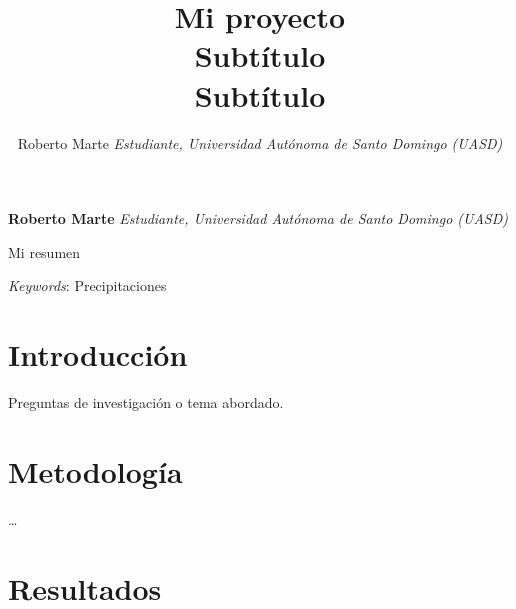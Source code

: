 \documentclass[11pt,]{article}
\title{Mi proyecto\\
Subtítulo\\
Subtítulo  }
\author{\Large Roberto Marte\vspace{0.05in} \newline\normalsize\emph{Estudiante, Universidad Autónoma de Santo Domingo (UASD)}  }
\date{}
\newcommand*{\authorfont}{\fontfamily{phv}\selectfont}
\renewenvironment{abstract}
 {{%
    \setlength{\leftmargin}{0mm}
    \setlength{\rightmargin}{\leftmargin}%
  }%
  \relax}
 {\endlist}
\begin{document}
	
%

{%
\setlength{\parindent}{0pt}
\thispagestyle{plain}
{\fontsize{18}{20}\selectfont\raggedright 
\maketitle  %

}

{
   \vskip 13.5pt\relax \normalsize\fontsize{11}{12} 
\textbf{\authorfont Roberto Marte} \hskip 15pt \emph{\small Estudiante, Universidad Autónoma de Santo Domingo (UASD)}   

}

}








\begin{abstract}

    \hbox{\vrule height .2pt width 39.14pc}

    \vskip 8.5pt %

\noindent Mi resumen


\vskip 8.5pt \noindent \emph{Keywords}: Precipitaciones \par

    \hbox{\vrule height .2pt width 39.14pc}



\end{abstract}


\vskip 6.5pt


\noindent  \section{Introducción}\label{introducciuxf3n}

Preguntas de investigación o tema abordado.

\section{Metodología}\label{metodologuxeda}

\ldots

\section{Resultados}\label{resultados}
\end{document}
